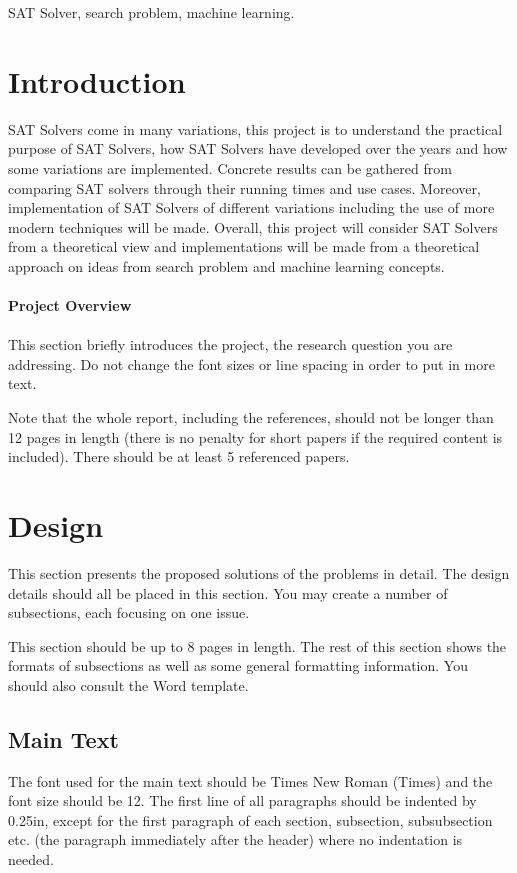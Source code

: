 \documentclass[12pt,a4paper]{article}
\begin{document}
\begin{keywords}
SAT Solver, search problem, machine learning.
\end{keywords}

\section{Introduction}
SAT Solvers come in many variations, this project is to understand the practical purpose of SAT Solvers, how SAT Solvers have developed over the years and how some variations are implemented. Concrete results can be gathered from comparing SAT solvers through their running times and use cases. Moreover, implementation of SAT Solvers of different variations including the use of more modern techniques will be made. Overall, this project will consider SAT Solvers from a theoretical view and implementations will be made from a theoretical approach on ideas from search problem and machine learning concepts.\\\\
{\bf Project Overview}\\\\
This section briefly introduces the project, the research question you are addressing.  Do not change the font sizes or line spacing in order to put in more text.

Note that the whole report, including the references, should not be longer than 12 pages in length (there is no penalty for short papers if the required content is included). There should be at least 5 referenced papers.

\section{Design}

This section presents the proposed solutions of the problems in detail. The design details should all be placed in this section. You may create a number of subsections, each focusing on one issue.

This section should be up to 8 pages in length.
The rest of this section shows the formats of subsections as well as some general formatting information.  You should also consult the Word template.

\subsection{Main Text}

The font used for the main text should be Times New Roman (Times) and the font size should be 12.  The first line of all paragraphs should be indented by 0.25in, except for the first paragraph of each section, subsection, subsubsection etc. (the paragraph immediately after the header) where no indentation is needed.
\end{document}
